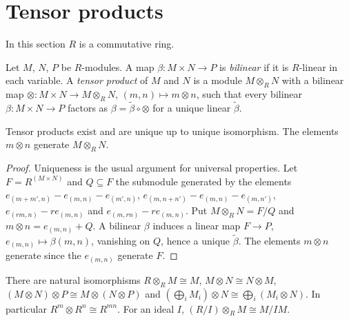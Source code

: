 \section{Tensor products}\label{rings:section-tensor}

In this section $R$ is a commutative ring.

\begin{definition}\label{rings:definition-tensor}
Let $M$, $N$, $P$ be $R$-modules. A map $\beta \colon M \times N \to P$ is \emph{bilinear} if it is
$R$-linear in each variable. A \emph{tensor product} of $M$ and $N$ is a module
$M \otimes_R N$ with a bilinear map $\otimes \colon M \times N \to M \otimes_R N$,
$(m, n) \mapsto m \otimes n$, such that every bilinear $\beta \colon M \times N \to P$ factors as
$\beta = \tilde\beta \circ \otimes$ for a unique linear $\tilde\beta$.
\end{definition}

\begin{proposition}\label{rings:proposition-tensor-exists}
Tensor products exist and are unique up to unique isomorphism. The elements
$m \otimes n$ generate $M \otimes_R N$.
\end{proposition}

\begin{proof}
Uniqueness is the usual argument for universal properties. Let $F = R^{(M \times N)}$ and
$Q \subseteq F$ the submodule generated by the elements
$e_{(m+m', n)} - e_{(m,n)} - e_{(m',n)}$, $e_{(m, n+n')} - e_{(m,n)} - e_{(m,n')}$,
$e_{(rm, n)} - re_{(m,n)}$ and $e_{(m, rn)} - re_{(m,n)}$. Put $M \otimes_R N = F/Q$ and
$m \otimes n = e_{(m,n)} + Q$. A bilinear $\beta$ induces a linear map $F \to P$,
$e_{(m,n)} \mapsto \beta(m,n)$, vanishing on $Q$, hence a unique $\tilde\beta$. The elements
$m \otimes n$ generate since the $e_{(m,n)}$ generate $F$.
\end{proof}

\begin{proposition}\label{rings:proposition-tensor-properties}
There are natural isomorphisms $R \otimes_R M \cong M$, $M \otimes N \cong N \otimes M$,
$(M \otimes N) \otimes P \cong M \otimes (N \otimes P)$ and
$(\bigoplus_i M_i) \otimes N \cong \bigoplus_i (M_i \otimes N)$. In particular
$R^m \otimes R^n \cong R^{mn}$. For an ideal $I$, $(R/I) \otimes_R M \cong M/IM$.
\end{proposition}

